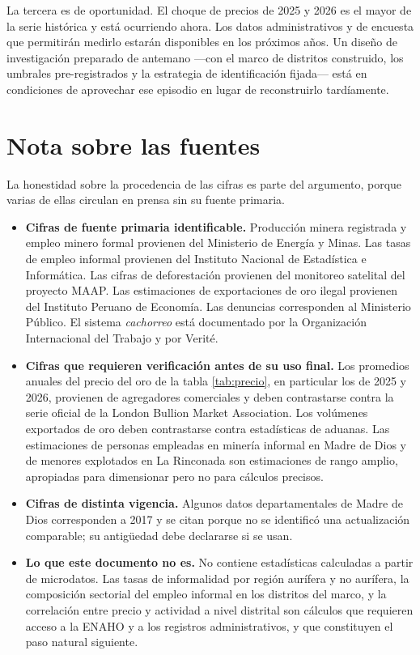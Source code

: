 \documentclass[11pt,a4paper]{article}
\begin{document}
La tercera es de oportunidad. El choque de precios de 2025 y 2026 es el mayor de la serie histórica y está ocurriendo ahora. Los datos administrativos y de encuesta que permitirán medirlo estarán disponibles en los próximos años. Un diseño de investigación preparado de antemano ---con el marco de distritos construido, los umbrales pre-registrados y la estrategia de identificación fijada--- está en condiciones de aprovechar ese episodio en lugar de reconstruirlo tardíamente.

\section{Nota sobre las fuentes}\label{sec:fuentes}

La honestidad sobre la procedencia de las cifras es parte del argumento, porque varias de ellas circulan en prensa sin su fuente primaria.

\begin{itemize}[leftmargin=1.6em,itemsep=3pt]
\item \textbf{Cifras de fuente primaria identificable.} Producción minera registrada y empleo minero formal provienen del Ministerio de Energía y Minas. Las tasas de empleo informal provienen del Instituto Nacional de Estadística e Informática. Las cifras de deforestación provienen del monitoreo satelital del proyecto MAAP. Las estimaciones de exportaciones de oro ilegal provienen del Instituto Peruano de Economía. Las denuncias corresponden al Ministerio Público. El sistema \emph{cachorreo} está documentado por la Organización Internacional del Trabajo y por Verité.

\item \textbf{Cifras que requieren verificación antes de su uso final.} Los promedios anuales del precio del oro de la tabla \ref{tab:precio}, en particular los de 2025 y 2026, provienen de agregadores comerciales y deben contrastarse contra la serie oficial de la London Bullion Market Association. Los volúmenes exportados de oro deben contrastarse contra estadísticas de aduanas. Las estimaciones de personas empleadas en minería informal en Madre de Dios y de menores explotados en La Rinconada son estimaciones de rango amplio, apropiadas para dimensionar pero no para cálculos precisos.

\item \textbf{Cifras de distinta vigencia.} Algunos datos departamentales de Madre de Dios corresponden a 2017 y se citan porque no se identificó una actualización comparable; su antigüedad debe declararse si se usan.

\item \textbf{Lo que este documento no es.} No contiene estadísticas calculadas a partir de microdatos. Las tasas de informalidad por región aurífera y no aurífera, la composición sectorial del empleo informal en los distritos del marco, y la correlación entre precio y actividad a nivel distrital son cálculos que requieren acceso a la ENAHO y a los registros administrativos, y que constituyen el paso natural siguiente.
\end{itemize}
\end{document}
